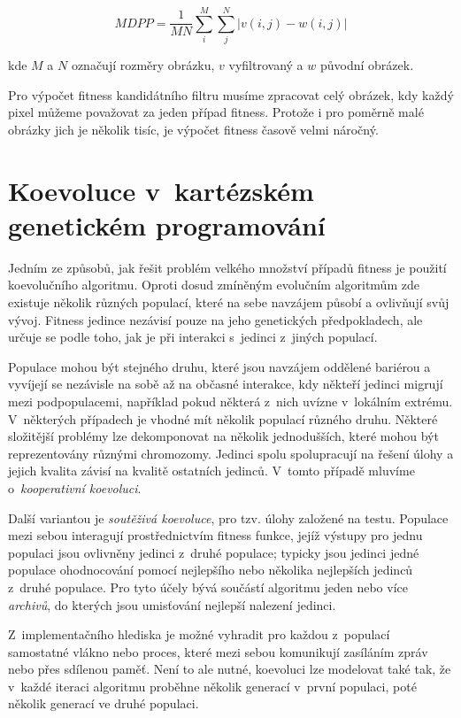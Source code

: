\begin{equation}
    \label{eqMDPP}
    \mathit{MDPP} = \frac{1}{MN} \sum\limits_i^M \sum\limits_j^N \left| v\left( i, j \right) - w\left( i, j \right) \right|
\end{equation}

\noindent{}kde $M$ a $N$ označují rozměry obrázku, $v$ vyfiltrovaný a $w$ původní obrázek.

Pro výpočet fitness kandidátního filtru musíme zpracovat celý obrázek, kdy každý pixel můžeme považovat za jeden případ fitness. Protože i pro poměrně malé obrázky jich je několik tisíc, je výpočet fitness časově velmi náročný.

\section{Koevoluce v~kartézském genetickém programování}

Jedním ze způsobů, jak řešit problém velkého množství případů fitness je použití koevolučního algoritmu. Oproti dosud zmíněným evolučním algoritmům zde existuje několik různých populací, které na sebe navzájem působí a ovlivňují svůj vývoj. Fitness jedince nezávisí pouze na jeho genetických předpokladech, ale určuje se podle toho, jak  je při interakci s~jedinci z~jiných populací.

Populace mohou být stejného druhu, které jsou navzájem oddělené bariérou a vyvíjejí se nezávisle na sobě až na občasné interakce, kdy někteří jedinci migrují mezi podpopulacemi, například pokud některá z~nich uvízne v~lokálním extrému. V~některých případech je vhodné mít několik populací různého druhu. Některé složitější problémy lze dekomponovat na několik jednodušších, které mohou být reprezentovány různými chromozomy. Jedinci spolu spolupracují na řešení úlohy a jejich kvalita závisí na kvalitě ostatních jedinců. V~tomto případě mluvíme o~\emph{kooperativní koevoluci}.

Další variantou je \emph{soutěživá koevoluce}, pro tzv. úlohy založené na testu. Populace mezi sebou interagují prostřednictvím fitness funkce, jejíž výstupy pro jednu populaci jsou ovlivněny jedinci z~druhé populace; typicky jsou jedinci jedné populace ohodnocování pomocí nejlepšího nebo několika nejlepších jedinců z~druhé populace. Pro tyto účely bývá součástí algoritmu jeden nebo více \emph{archivů}, do kterých jsou umisťování nejlepší nalezení jedinci.

Z~implementačního hlediska je možné vyhradit pro každou z~populací samostatné vlákno nebo proces, které mezi sebou komunikují zasíláním zpráv nebo přes sdílenou paměť. Není to ale nutné, koevoluci lze modelovat také tak, že v~každé iteraci algoritmu proběhne několik generací v~první populaci, poté několik generací ve druhé populaci.

